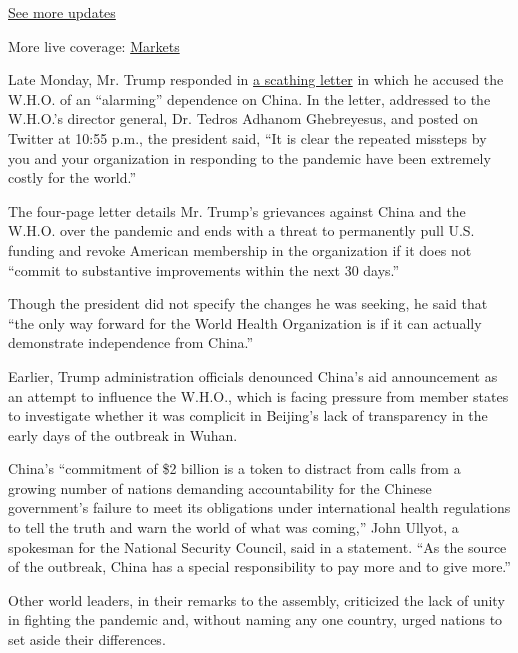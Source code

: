 \href{https://www.nytimes3xbfgragh.onion/2020/09/11/world/covid-19-coronavirus.html?action=click\&pgtype=Article\&state=default\&region=MAIN_CONTENT_1\&context=storylines_live_updates}{See
more updates}

More live coverage:
\href{https://www.nytimes3xbfgragh.onion/live/2020/09/11/business/stock-market-today-coronavirus?action=click\&pgtype=Article\&state=default\&region=MAIN_CONTENT_1\&context=storylines_live_updates}{Markets}

Late Monday, Mr. Trump responded in
\href{https://twitter.com/realDonaldTrump/status/1262577580718395393}{a
scathing letter} in which he accused the W.H.O. of an ``alarming''
dependence on China. In the letter, addressed to the W.H.O.'s director
general, Dr. Tedros Adhanom Ghebreyesus, and posted on Twitter at 10:55
p.m., the president said, ``It is clear the repeated missteps by you and
your organization in responding to the pandemic have been extremely
costly for the world.''

The four-page letter details Mr. Trump's grievances against China and
the W.H.O. over the pandemic and ends with a threat to permanently pull
U.S. funding and revoke American membership in the organization if it
does not ``commit to substantive improvements within the next 30 days.''

Though the president did not specify the changes he was seeking, he said
that ``the only way forward for the World Health Organization is if it
can actually demonstrate independence from China.''

Earlier, Trump administration officials denounced China's aid
announcement as an attempt to influence the W.H.O., which is facing
pressure from member states to investigate whether it was complicit in
Beijing's lack of transparency in the early days of the outbreak in
Wuhan.

China's ``commitment of \$2 billion is a token to distract from calls
from a growing number of nations demanding accountability for the
Chinese government's failure to meet its obligations under international
health regulations to tell the truth and warn the world of what was
coming,'' John Ullyot, a spokesman for the National Security Council,
said in a statement. ``As the source of the outbreak, China has a
special responsibility to pay more and to give more.''

Other world leaders, in their remarks to the assembly, criticized the
lack of unity in fighting the pandemic and, without naming any one
country, urged nations to set aside their differences.

